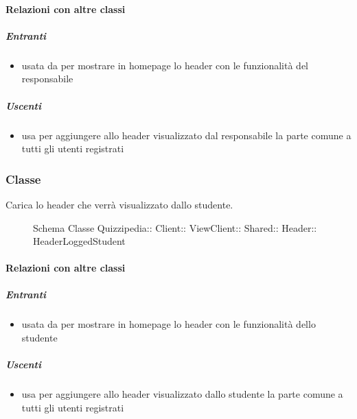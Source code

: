 \paragraph{Relazioni con altre classi}
\subparagraph{Entranti}
\begin{itemize}
\item usata da  per mostrare in homepage lo header con le funzionalità del responsabile
\end{itemize}
\subparagraph{Uscenti}
\begin{itemize}
\item usa  per aggiungere allo header visualizzato dal responsabile la parte comune a tutti gli utenti registrati
\end{itemize}
\subsubsection{Classe }
Carica lo header che verrà visualizzato dallo studente.
\begin{figure}[H]
\centering
\noindent{}
\caption[Schema Classe HeaderLoggedStudent]{Schema Classe Quizzipedia:: Client:: ViewClient:: Shared:: Header:: HeaderLoggedStudent}
\end{figure}
\paragraph{Relazioni con altre classi}
\subparagraph{Entranti}
\begin{itemize}
\item usata da  per mostrare in homepage lo header con le funzionalità dello studente
\end{itemize}
\subparagraph{Uscenti}
\begin{itemize}
\item usa  per aggiungere allo header visualizzato dallo studente la parte comune a tutti gli utenti registrati
\end{itemize}
